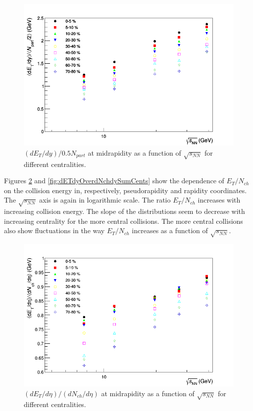 	\begin{figure}[h]
	  \centering
	  \includegraphics[width=5.5in]{figures/finalStacked/dETdyOverNpartBy2SumCent8s.png}
	  \caption{$(dE_{T}/dy)/0.5N_{part}$ at midrapidity as a function of $\sqrt{s_{NN}}$ for different centralities.}\label{fig:dETdyOverNpartBy2SumCents}
	\end{figure}
	
Figures \ref{fig:dETdEtaOverdNchdEtaSumCents} and \ref{fig:dETdyOverdNchdySumCents} show the dependence of $E_{T}/N_{ch}$ on the collision energy in, respectively, pseudorapidity and rapidity coordinates. The $\sqrt{s_{NN}}$ axis is again in logarithmic scale. The ratio $E_{T}/N_{ch}$ increases with increasing collision energy. The slope of the distributions seem to decrease with increasing centrality for the more central collisions.	The more central collisions also show fluctuations in the way $E_{T}/N_{ch}$ increases as a function of $\sqrt{s_{NN}}$.
	\begin{figure}[h]
	  \centering
	  \includegraphics[width=5.5in]{figures/finalStacked/dETdEtaOverdNchdEtaSumCent8s.png}
	  \caption{$(dE_{T}/d\eta)/(dN_{ch}/d\eta)$ at midrapidity as a function of $\sqrt{s_{NN}}$ for different centralities.}\label{fig:dETdEtaOverdNchdEtaSumCents}
	\end{figure}
	
